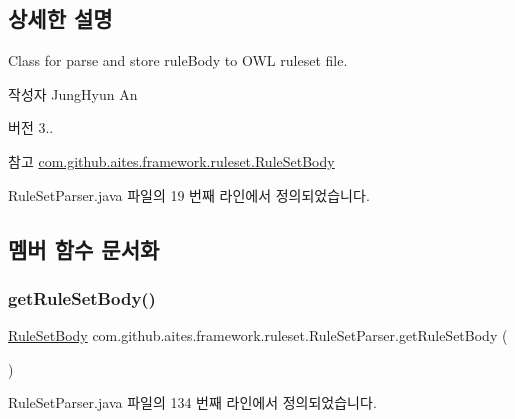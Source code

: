 \subsection{상세한 설명}
Class for parse and store rule\+Body to O\+WL ruleset file. 

\begin{DoxyAuthor}{작성자}
Jung\+Hyun An 
\end{DoxyAuthor}
\begin{DoxyVersion}{버전}
3.. 
\end{DoxyVersion}
\begin{DoxySeeAlso}{참고}
\mbox{\hyperlink{classcom_1_1github_1_1aites_1_1framework_1_1ruleset_1_1_rule_set_body}{com.\+github.\+aites.\+framework.\+ruleset.\+Rule\+Set\+Body}} 
\end{DoxySeeAlso}


Rule\+Set\+Parser.\+java 파일의 19 번째 라인에서 정의되었습니다.



\subsection{멤버 함수 문서화}
\mbox{\label{classcom_1_1github_1_1aites_1_1framework_1_1ruleset_1_1_rule_set_parser_a27e7145cb2cea6ccbd8996b907c6db0a}} 
\subsubsection{\texorpdfstring{get\+Rule\+Set\+Body()}{getRuleSetBody()}}
{\footnotesize\ttfamily \mbox{\hyperlink{classcom_1_1github_1_1aites_1_1framework_1_1ruleset_1_1_rule_set_body}{Rule\+Set\+Body}} com.\+github.\+aites.\+framework.\+ruleset.\+Rule\+Set\+Parser.\+get\+Rule\+Set\+Body (\begin{DoxyParamCaption}{ }\end{DoxyParamCaption})}



Rule\+Set\+Parser.\+java 파일의 134 번째 라인에서 정의되었습니다.


